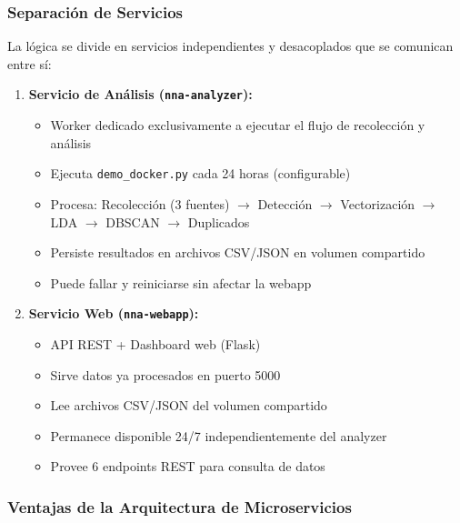 \subsubsection{Separación de Servicios}
\label{subsubsec:separacion_servicios}

La lógica se divide en servicios independientes y desacoplados que se comunican entre sí:

\begin{enumerate}
    \item \textbf{Servicio de Análisis (\texttt{nna-analyzer}):}
    \begin{itemize}
        \item Worker dedicado exclusivamente a ejecutar el flujo de recolección y análisis
        \item Ejecuta \texttt{demo\_docker.py} cada 24 horas (configurable)
        \item Procesa: Recolección (3 fuentes) $\rightarrow$ Detección $\rightarrow$ Vectorización $\rightarrow$ LDA $\rightarrow$ DBSCAN $\rightarrow$ Duplicados
        \item Persiste resultados en archivos CSV/JSON en volumen compartido
        \item Puede fallar y reiniciarse sin afectar la webapp
    \end{itemize}
    
    \item \textbf{Servicio Web (\texttt{nna-webapp}):}
    \begin{itemize}
        \item API REST + Dashboard web (Flask)
        \item Sirve datos ya procesados en puerto 5000
        \item Lee archivos CSV/JSON del volumen compartido
        \item Permanece disponible 24/7 independientemente del analyzer
        \item Provee 6 endpoints REST para consulta de datos
    \end{itemize}
\end{enumerate}

\subsubsection{Ventajas de la Arquitectura de Microservicios}
\label{subsubsec:ventajas_microservicios}

